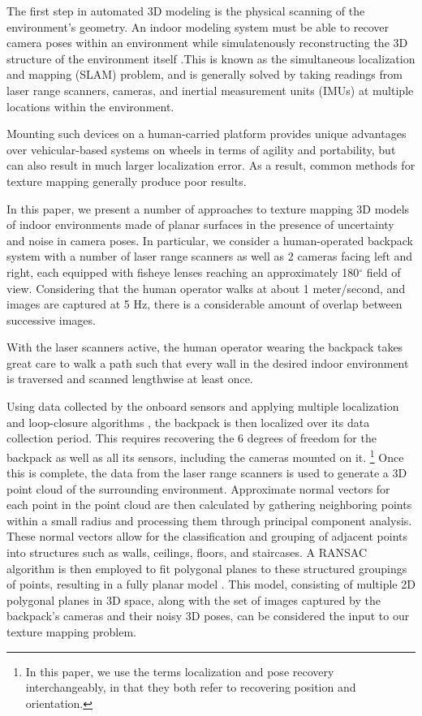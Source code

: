 \documentclass[10pt,twocolumn,letterpaper]{article}
\begin{document}
The first step in automated 3D modeling is the physical scanning of
the environment's geometry. An indoor modeling system must be able to
recover camera poses within an environment while simulatenously
reconstructing the 3D structure of the environment itself
\cite{chen2010indoor, hz, kua2012loopclosure, liu2010indoor}.This is
known as the simultaneous localization and mapping (SLAM) problem, and
is generally solved by taking readings from laser range scanners,
cameras, and inertial measurement units (IMUs) at multiple locations
within the environment.

Mounting such devices on a human-carried platform provides unique
advantages over vehicular-based systems on wheels in terms of agility and
portability, but can also result in much
larger localization error. As a result, common methods for texture
mapping generally produce poor results.

In this paper, we present a number of approaches to texture mapping 3D models of indoor environments made of planar surfaces in the presence of uncertainty and noise in camera poses. In particular, we consider a human-operated backpack system with a number of laser range scanners as well as 2 cameras facing left and right, each equipped with fisheye lenses reaching an approximately 180$^{\circ}$ field of view. Considering that the human operator walks at about 1 meter/second, and images are captured at 5 Hz, there is a considerable amount of overlap between successive images.

With the laser scanners active, the human operator wearing the
backpack takes great care to walk a path such that every wall in the
desired indoor environment is traversed and scanned lengthwise at
least once.

Using data collected by the onboard sensors and applying multiple localization
and loop-closure algorithms \cite{chen2010indoor, kua2012loopclosure,
  liu2010indoor}, the backpack is then localized over its
data collection period. This requires recovering the 6 degrees of freedom for the backpack as well as all its sensors, including the cameras mounted on it. \footnote{In this paper, we use the terms localization and pose recovery interchangeably, in that they both refer to recovering position and orientation.} Once this is complete, the data from the laser range scanners is used to generate a 3D point cloud of the surrounding environment. 
Approximate normal vectors for each point in the
point cloud are then calculated by gathering neighboring points within
a small radius and processing them through principal component
analysis. These normal vectors allow for the classification and
grouping of adjacent points into structures such as walls, ceilings,
floors, and staircases. A RANSAC algorithm is then employed to fit
polygonal planes to these structured groupings of points, resulting in
a fully planar model \cite{sanchez2012point}. This model, consisting
of multiple 2D polygonal planes in 3D space, along with the set of
images captured by the backpack's cameras and their noisy 3D poses,
can be considered the input to our texture mapping problem.
\end{document}
